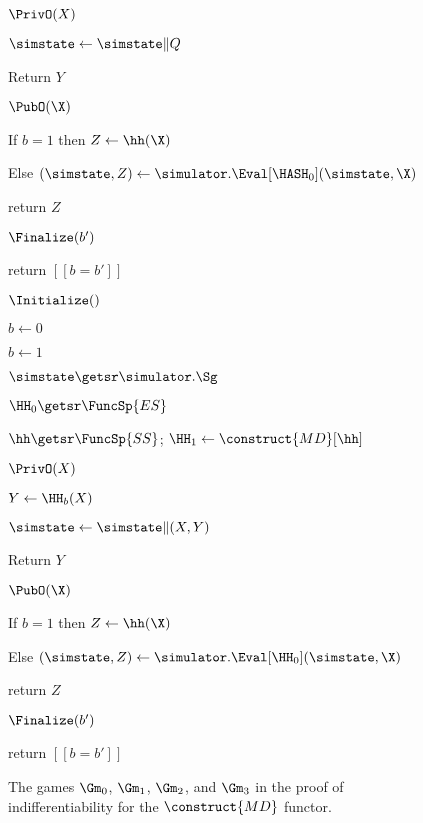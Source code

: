 \begin{figure}
{\begin{algorithm-subsequent}{$\PrivO(X)$}
			\item $\simstate\gets\simstate\|Q$  
			\item Return $Y$
		\end{algorithm-subsequent}	
		\ExptSepSpace
		\begin{algorithm-subsequent}{$\PubO(\X)$}
			\item If $b=1$ then  $Z\gets \hh(\X)$
			\item Else $(\simstate,Z) \gets \simulator.\Eval[\HASH_0] (\simstate,\X)$
			\item return $Z$
		\end{algorithm-subsequent}
		\ExptSepSpace
		\begin{algorithm-subsequent}{$\Finalize(b')$}
			\item return $[[b = b']]$
		\end{algorithm-subsequent}	
		}{
		
		\begin{algorithm-initial}{$\Initialize()$}
			\item $b \gets 0$ 
			\item $b \gets 1$ 
			\item $\simstate \getsr \simulator.\Sg$
			\item $\HH_0 \getsr \FuncSp{ES}$
			\item $\hh \getsr \FuncSp{SS}$; $\HH_1 \gets \construct{MD}[\hh]$ 
		\end{algorithm-initial}
		\ExptSepSpace
		\begin{algorithm-subsequent}{$\PrivO(X)$}
			\item $Y \gets \HH_b(X)$
			\item $\simstate\gets\simstate\| (X, Y)$  
			\item Return $Y$
		\end{algorithm-subsequent}	
		\ExptSepSpace
		\begin{algorithm-subsequent}{$\PubO(\X)$}
			\item If $b=1$ then  $Z\gets \hh(\X)$
			\item Else $(\simstate,Z) \gets \simulator.\Eval[\HH_0] (\simstate,\X)$
			\item return $Z$
		\end{algorithm-subsequent}
		\ExptSepSpace
		\begin{algorithm-subsequent}{$\Finalize(b')$}
			\item return $[[b = b']]$
		\end{algorithm-subsequent}	
		}
		\vspace{5pt}
		\caption{The games $\Gm_0$, $\Gm_1$, $\Gm_2$, and $\Gm_3$ in the proof of indifferentiability for the $\construct{MD}$ functor.}
		\label{fig-md-indiff-gm0123}
	\end{figure}
	
